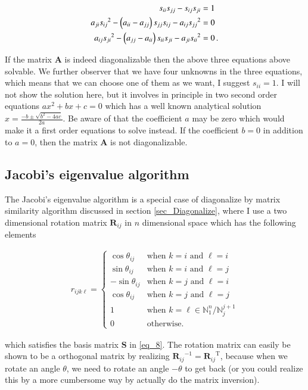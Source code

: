 \documentclass[11pt,english,a4paper]{article}
\begin{document}
\begin{flushleft}
\begin{align}
s_{ii} s_{jj} - s_{ij} s_{ji} &= 1 
\label{eq_10}\\
a_{ji} {s_{ij}}^2-\left({a_{ii}-a_{jj}}\right)s_{jj}s_{ij} - a_{ij}{s_{jj}}^2 &= 0 \label{eq_11}\\
a_{ij} {s_{ji}}^2 - \left({a_{jj}-a_{ii}}\right)s_{ii}s_{ji} - a_{ji}{s_{ii}}^2 &= 0 \,. \label{eq_12}
\end{align} 

If the matrix $\mathbf{A}$ is indeed diagonalizable then the above three equations above solvable. We further observer that we have four unknowns in the three equations, which means that we can choose one of them as we want, I suggest $s_{ii}=1$. I will not show the solution here, but it involves in principle in two second order equations $a x^2 + b x + c = 0$ which has a well known analytical solution $x = \frac{-b\pm\sqrt{b^2 - 4ac}}{2a}$. Be aware of that the coefficient $a$ may be zero which would make it a first order equations to solve instead. If the coefficient $b=0$ in addition to $a=0$, then the matrix $\mathbf{A}$ is not diagonalizable. \linebreak

\subsection{Jacobi's eigenvalue algorithm}

The Jacobi's eigenvalue algorithm is a special case of diagonalize by matrix similarity algorithm discussed in section \ref{sec_Diagonalize}, where I use a two dimensional rotation matrix $\textbf{R}_{ij}$ in $n$ dimensional space which has the following elements

\begin{align}
r_{ijk\ell} = \begin{cases} \cos\theta_{ij} & \text{when $k=i$ and $\ell=i$} \\ \sin\theta_{ij} & \text{when $k=i$ and $\ell=j$} \\ -\sin\theta_{ij} & \text{when $k=j$ and $\ell=i$} \\ \cos\theta_{ij} & \text{when $k=j$ and $\ell=j$}\\ 1 & \text{when } k=\ell\in\mathbb{N}_1^n / \mathbb{N}_j^{j+1}  \\ 0 & \text{otherwise.}\end{cases}
\label{eq_13}
\end{align} 

which satisfies the basis matrix $\mathbf{S}$ in \eqref{eq_8}. The rotation matrix can easily be shown to be a orthogonal matrix by realizing ${\mathbf{R}_{ij}}^{-1} = {\mathbf{R}_{ij}}^{\mathrm{T}}$, because when we rotate an angle $\theta$, we need to rotate an angle $-\theta$ to get back (or you could realize this by a more cumbersome way by actually do the matrix inversion). \linebreak


\end{flushleft}
\end{document}
